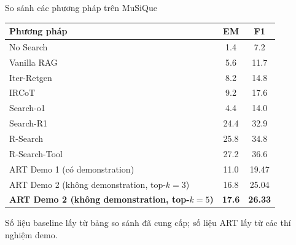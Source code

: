 \begin{frame}{So sánh các phương pháp trên MuSiQue}

\centering
\scriptsize
\begin{tabular}{lcc}
    \hline
    \textbf{Phương pháp} & \textbf{EM} & \textbf{F1} \\
    \hline
    No Search & 1.4 & 7.2 \\
    Vanilla RAG & 5.6 & 11.7 \\
    Iter-Retgen & 8.2 & 14.8 \\
    IRCoT & 9.2 & 17.6 \\
    Search-o1 & 4.4 & 14.0 \\
    Search-R1 & 24.4 & 32.9 \\
    R-Search & 25.8 & 34.8 \\
    R-Search-Tool & 27.2 & 36.6 \\
    \hline
ART Demo 1 (có demonstration) & 11.0 & 19.47 \\
ART Demo 2 (không demonstration, top-$k=3$) & 16.8 & 25.04 \\
\textbf{ART Demo 2 (không demonstration, top-$k=5$)} & \textbf{17.6} & \textbf{26.33} \\
    \hline
\end{tabular}

\vspace{0.2cm}

\raggedright
\tiny
Số liệu baseline lấy từ bảng so sánh đã cung cấp; số liệu ART lấy từ các thí nghiệm demo.

\end{frame}
